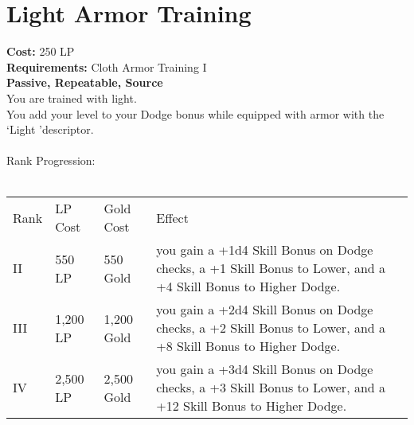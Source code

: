 \section{Light Armor Training}\label{perk:lightArmorTraining}
\textbf{Cost:} 250 LP\\
\textbf{Requirements:} Cloth Armor Training I\\
\textbf{Passive, Repeatable, Source}\\
You are trained with light.\\
You add your level to your Dodge bonus while equipped with armor with the \lq Light \rq descriptor.\\
\\

Rank Progression:\\
\\
\begin{longtable}{l | l | l | p{9cm}}
	Rank & LP Cost & Gold Cost & Effect\\
	II & 550 LP & 550 Gold & you gain a +1d4 Skill Bonus on Dodge checks, a +1 Skill Bonus to Lower, and a +4 Skill Bonus to Higher Dodge.\\
	III & 1,200 LP & 1,200 Gold & you gain a +2d4 Skill Bonus on Dodge checks, a +2 Skill Bonus to Lower, and a +8 Skill Bonus to Higher Dodge.\\
	IV & 2,500 LP & 2,500 Gold & you gain a +3d4 Skill Bonus on Dodge checks, a +3 Skill Bonus to Lower, and a +12 Skill Bonus to Higher Dodge.\\
\end{longtable}
